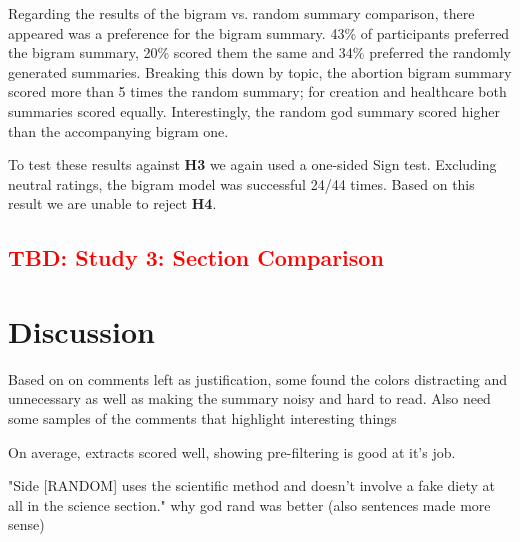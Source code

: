       Regarding the results of the bigram vs. random summary comparison, there appeared was a preference for the bigram summary. 43\% of participants preferred the bigram summary, 20\% scored them the same and 34\% preferred the randomly generated summaries. Breaking this down by topic, the abortion bigram summary scored more than 5 times the random summary; for creation and healthcare both summaries scored equally. Interestingly, the random god summary scored higher than the accompanying bigram one.

      To test these results against \textbf{H3} we again used a one-sided Sign test. Excluding neutral ratings, the bigram model was successful 24/44 times. Based on this result we are unable to reject \textbf{H4}.

    \subsection{\textcolor{red}{TBD: Study 3: Section Comparison}}

  \section{Discussion}
    Based on on comments left as justification, some found the colors distracting and unnecessary as well as making the summary noisy and hard to read.
    Also need some samples of the comments that highlight interesting things

    On average, extracts scored well, showing pre-filtering is good at it's job.


    "Side [RANDOM] uses the scientific method and doesn't involve a fake diety at all in the science section." why god rand was better (also sentences made more sense)
